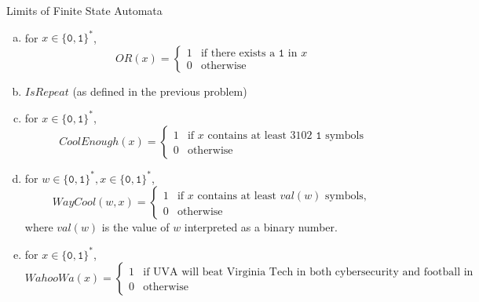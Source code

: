 \documentclass[11pt]{article}
\begin{document}
\begin{problem}
Limits of Finite State Automata
\end{problem}


\begin{enumerate}[(a)]
\item for $x \in \{\mathtt{0}, \mathtt{1}\}^*$, 
$$
\mathit{OR}(x) =  \begin{cases*}
                1 & \text{if there exists a $\mathtt{1}$ in $x$}\\
                0 & \text{otherwise}
        \end{cases*}
$$ 
\item $\mathit{IsRepeat}$ (as defined in the previous problem)

\item for $x \in \{\mathtt{0}, \mathtt{1}\}^*$,
$$
\mathit{CoolEnough}(x) =  \begin{cases*}
                1 & \text{if $x$ contains at least 3102 $\mathtt{1}$ symbols}\\
                0 & \text{otherwise}
        \end{cases*}
$$
\item for $w \in \{\mathtt{0}, \mathtt{1}\}^*, x \in \{\mathtt{0}, \mathtt{1}\}^*$,
$$
\mathit{WayCool}(w, x) =  \begin{cases*}
                1 & \text{if $x$ contains at least $\mathit{val}(w)$ symbols, }\\
                0 & \text{otherwise}
        \end{cases*}
$$
where $\mathit{val}(w)$ is the value of $w$ interpreted as a binary number.

\item for $x \in \{\mathtt{0}, \mathtt{1}\}^*$,
$$
\mathit{WahooWa}(x) =  \begin{cases*}
                1 & \text{if UVA will beat Virginia Tech in both cybersecurity and football in 2019, }\\
                0 & \text{otherwise}
        \end{cases*}
$$
\end{enumerate}
\end{document}
